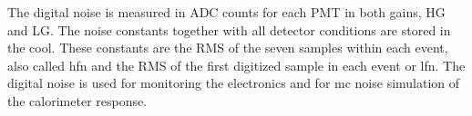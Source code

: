 The digital noise is measured in ADC counts for each PMT in both gains, HG and
LG\@. The noise constants together with all detector conditions are stored in
the \gls{cool}. These constants are the RMS of the seven samples within each
event, also called \gls{hfn} and the RMS of the first digitized sample in each
event or \gls{lfn}. The digital noise is used for monitoring the electronics and
for \gls{mc} noise simulation of the calorimeter response.
